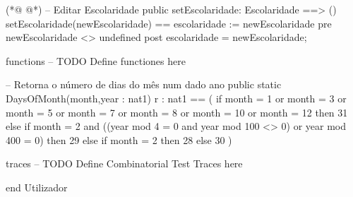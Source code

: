 \begin{vdmpp}[breaklines=true]
(*@
\label{DaysOfMonth:233}
@*)
 -- Editar Escolaridade
 public setEscolaridade: Escolaridade ==> ()
 setEscolaridade(newEscolaridade) == escolaridade := newEscolaridade
 pre newEscolaridade <> undefined
 post escolaridade = newEscolaridade;
 
functions
-- TODO Define functiones here

-- Retorna o número de dias do mês num dado ano
   public static DaysOfMonth(month,year : nat1) r : nat1 == (
    if month = 1 or month = 3 or month = 5 or month = 7 or month = 8 or month = 10 or month = 12 then
     31
    else if month = 2 and ((year mod 4 = 0 and year mod 100 <> 0) or year mod 400 = 0) then
     29
    else if month = 2 then
     28
    else
     30
   )

traces
-- TODO Define Combinatorial Test Traces here

end Utilizador
\end{vdmpp}
\bigskip
